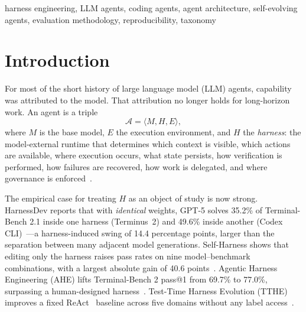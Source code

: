 \documentclass[conference]{IEEEtran}
\begin{document}
\begin{IEEEkeywords}
harness engineering, LLM agents, coding agents, agent architecture, self-evolving agents, evaluation methodology, reproducibility, taxonomy
\end{IEEEkeywords}

\section{Introduction}

For most of the short history of large language model (LLM) agents, capability was attributed to the model. That attribution no longer holds for long-horizon work. An agent is a triple
\begin{equation}
\mathcal{A} = \langle M, H, E \rangle,
\end{equation}
where $M$ is the base model, $E$ the execution environment, and $H$ the \emph{harness}: the model-external runtime that determines which context is visible, which actions are available, where execution occurs, what state persists, how verification is performed, how failures are recovered, how work is delegated, and where governance is enforced~\cite{b7}.

The empirical case for treating $H$ as an object of study is now strong. HarnessDev reports that with \emph{identical} weights, GPT-5 solves 35.2\% of Terminal-Bench 2.1 inside one harness (Terminus~2) and 49.6\% inside another (Codex CLI)~\cite{b6}---a harness-induced swing of 14.4 percentage points, larger than the separation between many adjacent model generations. Self-Harness shows that editing only the harness raises pass rates on nine model--benchmark combinations, with a largest absolute gain of 40.6 points~\cite{b4}. Agentic Harness Engineering (AHE) lifts Terminal-Bench 2 pass@1 from 69.7\% to 77.0\%, surpassing a human-designed harness~\cite{b3}. Test-Time Harness Evolution (TTHE) improves a fixed ReAct~\cite{b9} baseline across five domains without any label access~\cite{b5}.
\end{document}
